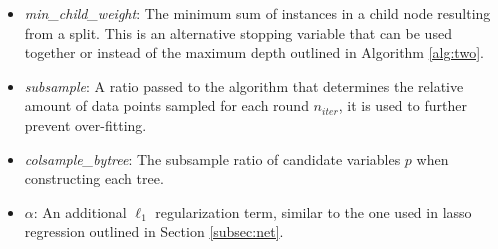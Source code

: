 \documentclass[a4paper,12pt, headsepline]{scrartcl}
\numberwithin{equation}{section}
\begin{document}
\begin{itemize}
	\item \textit{min\_child\_weight}: The minimum sum of instances in a child node resulting from a split. This is an alternative stopping variable that can be used together or instead of the maximum depth outlined in Algorithm \ref{alg:two}.
	\item \textit{subsample}: A ratio passed to the algorithm that determines the relative amount of data points sampled for each round $n_{iter}$, it is used to further prevent over-fitting.
	\item \textit{colsample\_bytree}: The subsample ratio of candidate variables $p$ when constructing each tree.
	\item $\alpha$: An additional $\ell_1$ regularization term, similar to the one used in lasso regression outlined in Section \ref{subsec:net}.
\end{itemize}
\vspace*{5pt}
\end{document}
